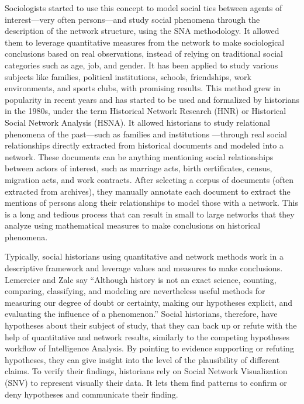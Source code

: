 Sociologists started to use this concept to model social ties between agents of interest---very often persons---and study social phenomena through the description of the network structure, using the SNA methodology\cite{wassermanSocialNetworkAnalysis1994}.
It allowed them to leverage quantitative measures from the network to make sociological conclusions based on real observations, instead of relying on traditional social categories such as age, job, and gender\cite{freemanDevelopmentSocialNetwork2004}.
It has been applied to study various subjects like families, political institutions, schools, friendships, work environments, and sports clubs, with promising results.
This method grew in popularity in recent years and has started to be used and formalized by historians in the 1980s, under the term Historical Network Research (HNR) or Historical Social Network Analysis (HSNA)\cite{wetherellHistoricalSocialNetwork1998}.
It allowed historians to study relational phenomena of the past---such as families and institutions ---through real social relationships directly extracted from historical documents and modeled into a network.
These documents can be anything mentioning social relationships between actors of interest, such as marriage acts, birth certificates, census, migration acts, and work contracts.
After selecting a corpus of documents (often extracted from archives), they manually annotate each document to extract the mentions of persons along their relationships to model those with a network.
This is a long and tedious process that can result in small to large networks that they analyze using mathematical measures to make conclusions on historical phenomena.

Typically, social historians using quantitative and network methods work in a descriptive framework and leverage values and measures to make conclusions.
Lemercier and Zalc say ``Although history is not an exact science, counting, comparing, classifying, and modeling are nevertheless useful methods for measuring our degree of doubt or certainty, making our hypotheses explicit, and evaluating the influence of a phenomenon.''\cite{lemercierQuantitativeMethodsHumanities2019}
Social historians, therefore, have hypotheses about their subject of study, that they can back up or refute with the help of quantitative and network results, similarly to the competing hypotheses workflow of Intelligence Analysis\cite{dhamiAnalysisCompetingHypotheses2019}.
By pointing to evidence supporting or refuting hypotheses, they can give insight into the level of the plausibility of different claims.
To verify their findings, historians rely on Social Network Visualization (SNV) to represent visually their data.
It lets them find patterns to confirm or deny hypotheses and communicate their finding.


